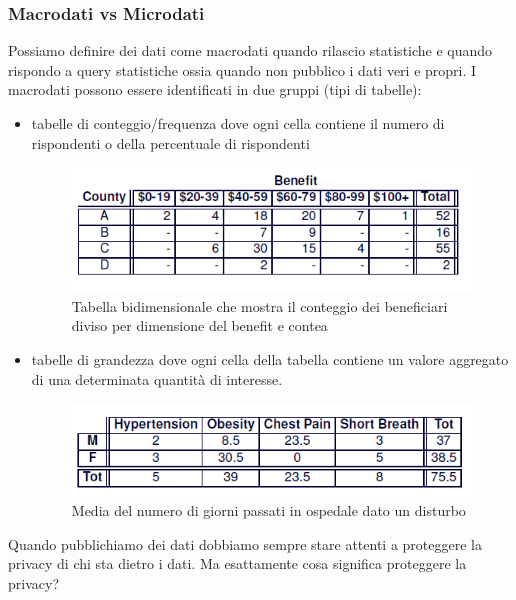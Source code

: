 \subsubsection{Macrodati vs Microdati}
Possiamo definire dei dati come macrodati quando rilascio statistiche e quando rispondo a query statistiche ossia quando non pubblico i dati veri e propri. I macrodati possono essere identificati in due gruppi (tipi di tabelle):
\begin{itemize}
    \item tabelle di conteggio/frequenza dove ogni cella contiene il numero di rispondenti o della percentuale di rispondenti
    \begin{center}
        \begin{figure}[h!]
          \includegraphics[scale=0.8]{img/counttable.png}
          \caption{Tabella bidimensionale che mostra il conteggio dei beneficiari diviso per dimensione del benefit e contea}
        \end{figure}
    \end{center}
    \item tabelle di grandezza dove ogni cella della tabella contiene un valore aggregato di una determinata quantità di interesse.
    \begin{center}
        \begin{figure}[h!]
          \includegraphics[scale=0.8]{img/magtable.png}
          \caption{Media del numero di giorni passati in ospedale dato un disturbo}
        \end{figure}
    \end{center}
\end{itemize}
Quando pubblichiamo dei dati dobbiamo sempre stare attenti a proteggere la privacy di chi sta dietro i dati. Ma esattamente cosa significa proteggere la privacy?
